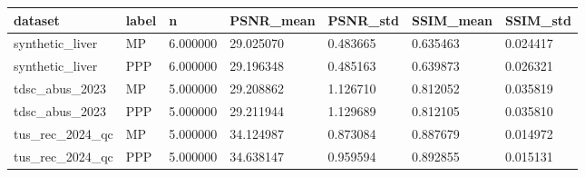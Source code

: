 \begin{tabular}{lllllll}
dataset & label & n & PSNR\_mean & PSNR\_std & SSIM\_mean & SSIM\_std \\
\hline
synthetic\_liver & MP & 6.000000 & 29.025070 & 0.483665 & 0.635463 & 0.024417 \\
synthetic\_liver & PPP & 6.000000 & 29.196348 & 0.485163 & 0.639873 & 0.026321 \\
tdsc\_abus\_2023 & MP & 5.000000 & 29.208862 & 1.126710 & 0.812052 & 0.035819 \\
tdsc\_abus\_2023 & PPP & 5.000000 & 29.211944 & 1.129689 & 0.812105 & 0.035810 \\
tus\_rec\_2024\_qc & MP & 5.000000 & 34.124987 & 0.873084 & 0.887679 & 0.014972 \\
tus\_rec\_2024\_qc & PPP & 5.000000 & 34.638147 & 0.959594 & 0.892855 & 0.015131 \\
\end{tabular}
